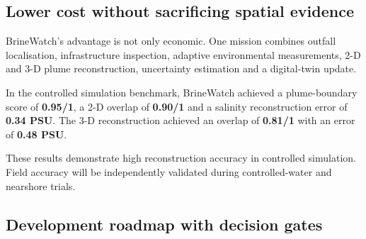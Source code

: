 \documentclass[10pt,a4paper]{article}
\newcommand{\metric}[1]{{\sffamily\bfseries\color{teal}#1}}
\begin{document}
\newpage
\subsection*{\sffamily\color{deepblue}Lower cost without sacrificing spatial evidence}

BrineWatch's advantage is not only economic. One mission combines outfall localisation,
infrastructure inspection, adaptive environmental measurements, 2-D and 3-D plume reconstruction,
uncertainty estimation and a digital-twin update.

In the controlled simulation benchmark, BrineWatch achieved a plume-boundary score of
\metric{0.95/1}, a 2-D overlap of \metric{0.90/1} and a salinity reconstruction error of
\metric{0.34 PSU}. The 3-D reconstruction achieved an overlap of \metric{0.81/1} with an error of
\metric{0.48 PSU}.

These results demonstrate high reconstruction accuracy in controlled simulation. Field accuracy
will be independently validated during controlled-water and nearshore trials.

\subsection*{\sffamily\color{deepblue}Development roadmap with decision gates}

\begin{center}
\end{center}
\end{document}
